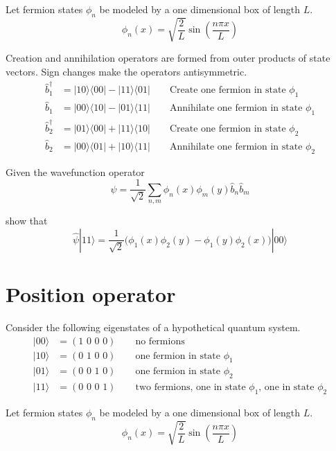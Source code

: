 \documentclass[12pt]{article}
\begin{document}
\noindent
Let fermion states $\phi_n$ be modeled by a one dimensional box of length $L$.
\begin{equation*}
\phi_n(x)=\sqrt{\frac{2}{L}}\sin\left(\frac{n\pi x}{L}\right)
\end{equation*}

\noindent
Creation and annihilation operators are formed from outer products of state vectors.
Sign changes make the operators antisymmetric.
\begin{align*}
\hat{b}_1^\dag&=|10\rangle\langle00|-|11\rangle\langle01| \qquad\text{Create one fermion in state $\phi_1$}
\\
\hat{b}_1&=|00\rangle\langle10|-|01\rangle\langle11| \qquad\text{Annihilate one fermion in state $\phi_1$}
\\
\hat{b}_2^\dag&=|01\rangle\langle00|+|11\rangle\langle10| \qquad\text{Create one fermion in state $\phi_2$}
\\
\hat{b}_2&=|00\rangle\langle01|+|10\rangle\langle11| \qquad\text{Annihilate one fermion in state $\phi_2$}
\end{align*}

\noindent
Given the wavefunction operator
\begin{equation*}
\hat{\psi}=\frac{1}{\sqrt{2}}\sum_{n,m}\phi_n(x)\phi_m(y)\hat{b}_n\hat{b}_m
\end{equation*}

\noindent
show that
\begin{equation*}
\hat{\psi}|11\rangle=\frac{1}{\sqrt{2}}\big(\phi_1(x)\phi_2(y)-\phi_1(y)\phi_2(x)\big)|00\rangle
\end{equation*}

\newpage

\section{Position operator}
Consider the following eigenstates of a hypothetical quantum system.
\begin{align*}
|00\rangle&=(\text{1 0 0 0})\qquad\text{no fermions}\\
|10\rangle&=(\text{0 1 0 0})\qquad\text{one fermion in state $\phi_1$}\\
|01\rangle&=(\text{0 0 1 0})\qquad\text{one fermion in state $\phi_2$}\\
|11\rangle&=(\text{0 0 0 1})\qquad\text{two fermions, one in state $\phi_1$, one in state $\phi_2$}
\end{align*}

\noindent
Let fermion states $\phi_n$ be modeled by a one dimensional box of length $L$.
\begin{equation*}
\phi_n(x)=\sqrt{\frac{2}{L}}\sin\left(\frac{n\pi x}{L}\right)
\end{equation*}
\end{document}
